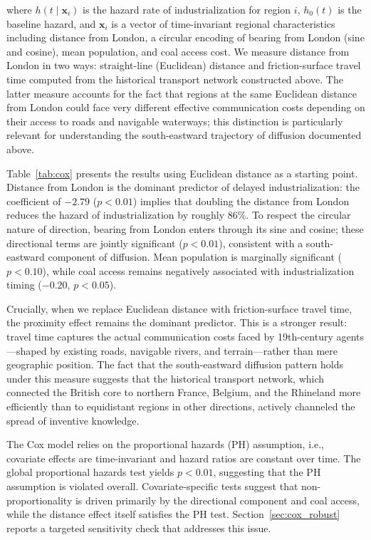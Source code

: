 \documentclass[letterpaper,12pt,leqno]{article}
\begin{document}
\noindent where \(h(t \mid \mathbf{x}_i)\) is the hazard rate of industrialization for region \(i\), \(h_0(t)\) is the baseline hazard, and \(\mathbf{x}_i\) is a vector of time-invariant regional characteristics including distance from London, a circular encoding of bearing from London (sine and cosine), mean population, and coal access cost. We measure distance from London in two ways: straight-line (Euclidean) distance and friction-surface travel time computed from the historical transport network constructed above. The latter measure accounts for the fact that regions at the same Euclidean distance from London could face very different effective communication costs depending on their access to roads and navigable waterways; this distinction is particularly relevant for understanding the south-eastward trajectory of diffusion documented above.



Table~\ref{tab:cox} presents the results using Euclidean distance as a starting point. Distance from London is the dominant predictor of delayed industrialization: the coefficient of \(-2.79\) (\(p < 0.01\)) implies that doubling the distance from London reduces the hazard of industrialization by roughly 86\%. To respect the circular nature of direction, bearing from London enters through its sine and cosine; these directional terms are jointly significant (\(p < 0.01\)), consistent with a south-eastward component of diffusion. Mean population is marginally significant (\(p < 0.10\)), while coal access remains negatively associated with industrialization timing (\(-0.20\), \(p < 0.05\)).

Crucially, when we replace Euclidean distance with friction-surface travel time, the proximity effect remains the dominant predictor. This is a stronger result: travel time captures the actual communication costs faced by 19th-century agents---shaped by existing roads, navigable rivers, and terrain---rather than mere geographic position. The fact that the south-eastward diffusion pattern holds under this measure suggests that the historical transport network, which connected the British core to northern France, Belgium, and the Rhineland more efficiently than to equidistant regions in other directions, actively channeled the spread of inventive knowledge.

The Cox model relies on the proportional hazards (PH) assumption, i.e., covariate effects are time-invariant and hazard ratios are constant over time. The global proportional hazards test yields \(p < 0.01\), suggesting that the PH assumption is violated overall. Covariate-specific tests suggest that non-proportionality is driven primarily by the directional component and coal access, while the distance effect itself satisfies the PH test. Section~\ref{sec:cox_robust} reports a targeted sensitivity check that addresses this issue.
\end{document}

